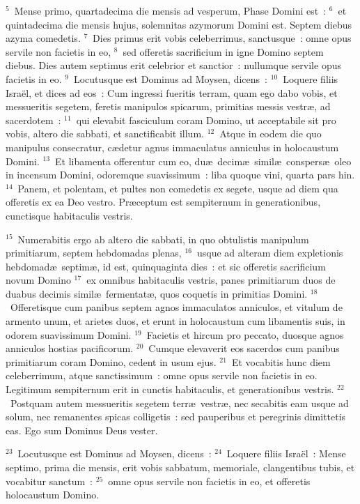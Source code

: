 ${}^{5}$~Mense primo, quartadecima die mensis ad vesperum, Phase Domini est~:
${}^{6}$~et quintadecima die mensis hujus, solemnitas azymorum Domini est. Septem diebus azyma comedetis.
${}^{7}$~Dies primus erit vobis celeberrimus, sanctusque~: omne opus servile non facietis in eo,
${}^{8}$~sed offeretis sacrificium in igne Domino septem diebus. Dies autem septimus erit celebrior et sanctior~: nullumque servile opus facietis in eo.
${}^{9}$~Locutusque est Dominus ad Moysen, dicens~:
${}^{10}$~Loquere filiis Isra\"el, et dices ad eos~: Cum ingressi fueritis terram, quam ego dabo vobis, et messueritis segetem, feretis manipulos spicarum, primitias messis vestr\ae , ad sacerdotem~:
${}^{11}$~qui elevabit fasciculum coram Domino, ut acceptabile sit pro vobis, altero die sabbati, et sanctificabit illum.
${}^{12}$~Atque in eodem die quo manipulus consecratur, c\ae detur agnus immaculatus anniculus in holocaustum Domini.
${}^{13}$~Et libamenta offerentur cum eo, du\ae\ decim\ae\ simil\ae\ conspers\ae\ oleo in incensum Domini, odoremque suavissimum~: liba quoque vini, quarta pars hin.
${}^{14}$~Panem, et polentam, et pultes non comedetis ex segete, usque ad diem qua offeretis ex ea Deo vestro. Pr\ae ceptum est sempiternum in generationibus, cunctisque habitaculis vestris.


${}^{15}$~Numerabitis ergo ab altero die sabbati, in quo obtulistis manipulum primitiarum, septem hebdomadas plenas,
${}^{16}$~usque ad alteram diem expletionis hebdomad\ae\ septim\ae , id est, quinquaginta dies~: et sic offeretis sacrificium novum Domino
${}^{17}$~ex omnibus habitaculis vestris, panes primitiarum duos de duabus decimis simil\ae\ fermentat\ae , quos coquetis in primitias Domini.
${}^{18}$~Offeretisque cum panibus septem agnos immaculatos anniculos, et vitulum de armento unum, et arietes duos, et erunt in holocaustum cum libamentis suis, in odorem suavissimum Domini.
${}^{19}$~Facietis et hircum pro peccato, duosque agnos anniculos hostias pacificorum.
${}^{20}$~Cumque elevaverit eos sacerdos cum panibus primitiarum coram Domino, cedent in usum ejus.
${}^{21}$~Et vocabitis hunc diem celeberrimum, atque sanctissimum~: omne opus servile non facietis in eo. Legitimum sempiternum erit in cunctis habitaculis, et generationibus vestris.
${}^{22}$~Postquam autem messueritis segetem terr\ae\ vestr\ae , nec secabitis eam usque ad solum, nec remanentes spicas colligetis~: sed pauperibus et peregrinis dimittetis eas. Ego sum Dominus Deus vester.


${}^{23}$~Locutusque est Dominus ad Moysen, dicens~:
${}^{24}$~Loquere filiis Isra\"el~: Mense septimo, prima die mensis, erit vobis sabbatum, memoriale, clangentibus tubis, et vocabitur sanctum~:
${}^{25}$~omne opus servile non facietis in eo, et offeretis holocaustum Domino.


